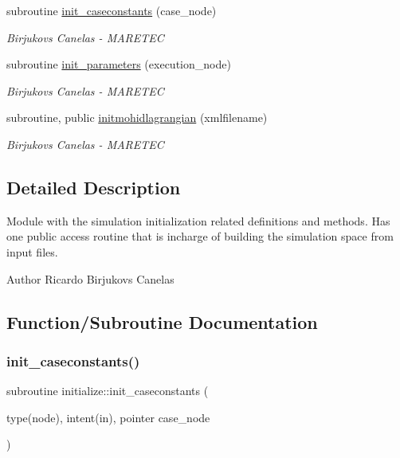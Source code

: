 \begin{DoxyCompactItemize}
subroutine \mbox{\hyperlink{namespaceinitialize_a4c982b312ab10bf112dd3d2bc314569e}{init\+\_\+caseconstants}} (case\+\_\+node)
\begin{DoxyCompactList}\small\item\em Birjukovs Canelas -\/ M\+A\+R\+E\+T\+EC \end{DoxyCompactList}\item 
subroutine \mbox{\hyperlink{namespaceinitialize_a7a54dc126f448bea2b566339a449f85c}{init\+\_\+parameters}} (execution\+\_\+node)
\begin{DoxyCompactList}\small\item\em Birjukovs Canelas -\/ M\+A\+R\+E\+T\+EC \end{DoxyCompactList}\item 
subroutine, public \mbox{\hyperlink{namespaceinitialize_a45b7ca20c45cf272acbc391950cbb804}{initmohidlagrangian}} (xmlfilename)
\begin{DoxyCompactList}\small\item\em Birjukovs Canelas -\/ M\+A\+R\+E\+T\+EC \end{DoxyCompactList}\end{DoxyCompactItemize}


\subsection{Detailed Description}
Module with the simulation initialization related definitions and methods. Has one public access routine that is incharge of building the simulation space from input files. 

\begin{DoxyAuthor}{Author}
Ricardo Birjukovs Canelas 
\end{DoxyAuthor}


\subsection{Function/\+Subroutine Documentation}
\mbox{\label{namespaceinitialize_a4c982b312ab10bf112dd3d2bc314569e}} 
\subsubsection{\texorpdfstring{init\+\_\+caseconstants()}{init\_caseconstants()}}
{\footnotesize\ttfamily subroutine initialize\+::init\+\_\+caseconstants (\begin{DoxyParamCaption}\item[{type(node), intent(in), pointer}]{case\+\_\+node }\end{DoxyParamCaption})\hspace{0.3cm}{\ttfamily [private]}}



